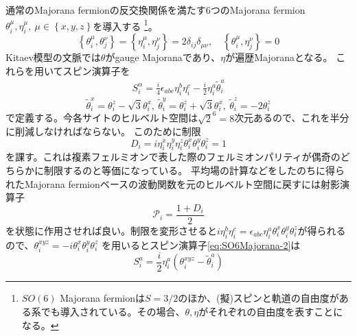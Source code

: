 \documentclass[11pt, aps, longbibliography]{article}
\begin{document}
        通常のMajorana fermionの反交換関係を満たす6つのMajorana fermion $\theta_i^\mu, \eta_{i}^\mu, \ \mu \in \left\{x,y,z\right\}$を導入する
        \footnote{$SO(6)$ Majorana fermionは$S=3/2$のほか、(擬)スピンと軌道の自由度がある系でも導入されている。その場合、$\theta,\eta$がそれぞれの自由度を表すことになる。}。\cite{PhysRevB.102.075110,41467-022-31503-0,PhysRevB.108.075111}
        \begin{equation}\label{eq:SO6Majorana-1}
            \left\{ \theta_i^\mu, \theta_j^\nu \right\} = \left\{ \eta_i^\mu, \eta_j^\nu \right\} = 2\delta_{ij}\delta_{\mu\nu}, \quad \left\{ \theta_i^\mu, \eta_j^\nu \right\} = 0
        \end{equation}
        Kitaev模型の文脈では$\theta$がgauge Majoranaであり、$\eta$が遍歴Majoranaとなる。
        これらを用いてスピン演算子を
        \begin{align}\label{eq:SO6Majorana-2}
            S_i^\alpha = \frac{i}{4}\epsilon_{abc}\eta_i^b \eta_i^c - \frac{i}{2}\eta_i^a \tilde{\theta}_i^a 
        \end{align}
        \begin{equation}\label{eq:SO6Majorana-3}
            \tilde{\theta}_i^x = \theta_i^z - \sqrt{3}\theta_i^x, \ \tilde{\theta}_i^y = \theta_i^z + \sqrt{3}\theta_i^x, \ \tilde{\theta}_i^z = -2\theta_i^z
        \end{equation}
        で定義する。今各サイトのヒルベルト空間は$\sqrt{2}^6=8$次元あるので、これを半分に削減しなければならない。
        このために制限
        \begin{equation}\label{eq:SO6Majorana-4}
            D_i = i\eta_i^x\eta_i^y\eta_i^z\theta_i^x\theta_i^y\theta_i^z = 1
        \end{equation}
        を課す。これは複素フェルミオンで表した際のフェルミオンパリティが偶奇のどちらかに制限するのと等価になっている。
        平均場の計算などをしたのちに得られたMajorana fermionベースの波動関数を元のヒルベルト空間に戻すには射影演算子
        \begin{equation}\label{eq:SO6Majorana-5}
            \mathcal{P}_i = \frac{1+D_i}{2}
        \end{equation}
        を状態に作用させれば良い。制限を変形させると$i\eta_i^b\eta_i^c = \epsilon_{abc}\eta_i^a \theta_i^x\theta_i^y\theta_i^z$が得られるので、$\theta_i^{xyz}=-i\theta_i^x\theta_i^y\theta_i^z$
        を用いるとスピン演算子\eqref{eq:SO6Majorana-2}は
        \begin{equation}\label{eq:SO6Majorana-6}
            S_i^a = \frac{i}{2} \eta_i^a \left( \theta_i^{xyz} - \tilde{\theta}_i^a \right)
        \end{equation}
\end{document}
